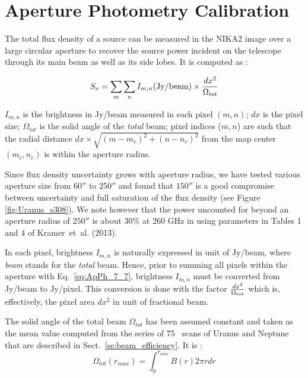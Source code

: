 \section{Aperture Photometry Calibration}%

The total flux density of a source can be measured in the NIKA2 image
over a large circular aperture to recover the source power incident on the telescope through its main
beam as well as its side lobes. It is computed as :

\begin{equation}
S_{\nu} = \sum_{m} \sum_{n}  I_{m,n} ({\rm Jy/beam}) \times {dx^2 \over {\Omega_{tot}}}
\label{eq:ApPh_7_7}
\end{equation}

\noindent  $I_{m,n}$ is the brightness in Jy/beam measured in each pixel $(m,n)$; $dx$ is the pixel size;
$\Omega_{tot}$ is the solid angle of the {\it total} beam; pixel
indices ($m,n$) are such that the radial distance $dx \times
\sqrt{(m-m_c)^2 + (n-n_c)^2}$ from the map center $(m_c,n_c)$
is within the aperture radius. 

Since flux density uncertainty grows with aperture radius, we have tested various aperture size from $60''$
to $250''$ and found that $150''$ is a good compromise between
uncertainty and full saturation of the flux density (see Figure
\ref{fig:Uranus_s308}).
We note however that the power uncounted for beyond an aperture radius
of $250''$ is about 30\% at 260 GHz in using parameters in Tables 1 and 4 of Kramer~et~al.
(2013). %

In each pixel, brightness $I_{m,n}$ is naturally expressed in unit of
Jy/beam, where  {\it beam} stands for the {\it total} beam.
Hence, prior to summing all pixels within the aperture with
Eq.~\ref{eq:ApPh_7_7}, brightness $I_{m,n}$
must be converted from  Jy/beam to Jy/pixel. This
conversion is done with the factor $dx^2 \over {\Omega_{tot}}$
which is, effectively, the pixel area $dx^2$ in unit of fractional
beam. 

The solid angle of the total beam $\Omega_{tot}$ has been assumed
constant and taken as the mean value computed from the series of 75
\bm\ scans of Uranus and Neptune that are described in
Sect.~\ref{se:beam_efficiency}.
It is : 
\begin{equation}
 \Omega_{tot} (r_{max}) = \int_0^{r_{max}} B(r) 2 \pi r dr
\label{eq:Otrue}
\end{equation}


